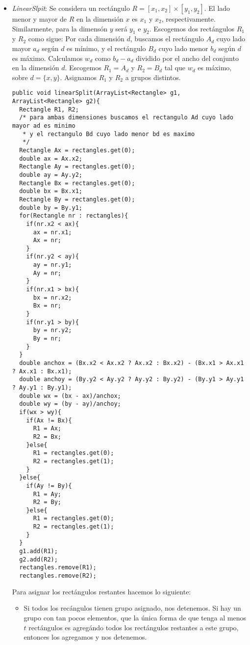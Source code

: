 \documentclass[letterpaper,12pt]{article}
\begin{document}
\begin{itemize}
\begin{itemize}
\end{itemize}

\item \textit{LinearSlpit}: Se considera un rect\'angulo $R = [x_1, x_2] \times [y_1, y_2]$. El lado menor y mayor de $R$ en la dimensi\'on $x$ es $x_1$ y $x_2$, respectivamente. Similarmente, para la dimens\'on $y$ ser\'a $y_1$ e $y_2$. Escogemos dos rect\'angulos $R_1$ y $R_2$ como sigue: Por cada dimensi\'on $d$, buscamos el rect\'angulo $A_d$ cuyo lado mayor $a_d$ seg\'un $d$ es m\'inimo, y el rect\'angulo $B_d$ cuyo lado menor $b_d$ seg\'un $d$ es m\'aximo. Calculamos $w_d$ como $b_d - a_d$ dividido por el ancho del conjunto en la dimensi\'on $d$. Escogemos $R_1 = A_d$ y $R_2 = B_d$ tal que $w_d$ es m\'aximo, sobre $d = \{x, y\}$. Asignamos $R_1$ y $R_2$ a grupos distintos.

\lstset{language=Java, breaklines=true, basicstyle=\footnotesize}
\begin{lstlisting}[frame=single]
public void linearSplit(ArrayList<Rectangle> g1, ArrayList<Rectangle> g2){
  Rectangle R1, R2;
  /* para ambas dimensiones buscamos el rectangulo Ad cuyo lado mayor ad es minimo
   * y el rectangulo Bd cuyo lado menor bd es maximo
   */
  Rectangle Ax = rectangles.get(0);
  double ax = Ax.x2;
  Rectangle Ay = rectangles.get(0);
  double ay = Ay.y2;
  Rectangle Bx = rectangles.get(0);
  double bx = Bx.x1;
  Rectangle By = rectangles.get(0);
  double by = By.y1;
  for(Rectangle nr : rectangles){
    if(nr.x2 < ax){
      ax = nr.x1;
      Ax = nr;
    }
    if(nr.y2 < ay){
      ay = nr.y1;
      Ay = nr;
    }
    if(nr.x1 > bx){
      bx = nr.x2;
      Bx = nr;
    }
    if(nr.y1 > by){
      by = nr.y2;
      By = nr;
    }
  }
  double anchox = (Bx.x2 < Ax.x2 ? Ax.x2 : Bx.x2) - (Bx.x1 > Ax.x1 ? Ax.x1 : Bx.x1);
  double anchoy = (By.y2 < Ay.y2 ? Ay.y2 : By.y2) - (By.y1 > Ay.y1 ? Ay.y1 : By.y1);
  double wx = (bx - ax)/anchox;
  double wy = (by - ay)/anchoy;
  if(wx > wy){
    if(Ax != Bx){
      R1 = Ax;
      R2 = Bx;
    }else{
      R1 = rectangles.get(0);
      R2 = rectangles.get(1);
    }
  }else{
    if(Ay != By){
      R1 = Ay;
      R2 = By;
    }else{
      R1 = rectangles.get(0);
      R2 = rectangles.get(1);
    }
  }
  g1.add(R1);
  g2.add(R2);
  rectangles.remove(R1);
  rectangles.remove(R2);
\end{lstlisting}

 Para asignar los rect\'angulos restantes hacemos lo siguiente:
\begin{itemize}
\item Si todos los rec\'angulos tienen grupo asignado, nos detenemos. Si hay un grupo con tan pocos elementos, que la \'unica forma de que tenga al menos $t$ rect\'angulos es agreg\'ando todos los rect\'angulos restantes a este grupo, entonces los agregamos y nos detenemos.


\end{itemize}
\end{itemize}
\end{document}
